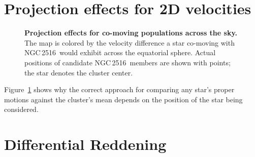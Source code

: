 \documentclass[12pt,twocolumn,tighten]{aastex63}
\newcommand{\cn}{NGC\,2516} %
\begin{document}
\section{Projection effects for 2D velocities}
\label{app:vproj}

\begin{figure}[t]
	\begin{center}
		\leavevmode

	\end{center}
	\vspace{-0.7cm}
  \caption{ {\bf Projection effects for co-moving populations across
  the sky.} The map is colored by the velocity difference a star
  co-moving with \cn\ would exhibit across the equatorial sphere.
  Actual positions of candidate \cn\ members are shown with points;
  the star denotes the cluster center.
	\label{fig:vproj}
	}
\end{figure}

Figure~\ref{fig:vproj} shows why the correct approach for comparing
any star's proper motions against the cluster's mean depends on the
position of the star being considered.


\section{Differential Reddening}
\label{app:diffred}
\end{document}
